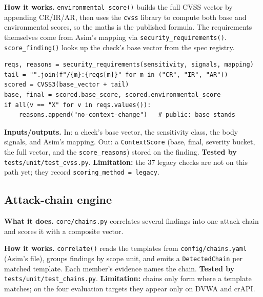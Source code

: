 \textbf{How it works.} \texttt{environmental\_score()} builds the full CVSS
vector by appending CR/IR/AR, then uses the \texttt{cvss} library to compute both
base and environmental scores, so the maths is the published formula. The
requirements themselves come from Asim's mapping via
\texttt{security\_requirements()}. \texttt{score\_finding()} looks up the check's
base vector from the spec registry.

\begin{lstlisting}[style=py,caption={Append CR/IR/AR, recompute with the \texttt{cvss} library (\texttt{core/cvss.py}).}]
reqs, reasons = security_requirements(sensitivity, signals, mapping)
tail = "".join(f"/{m}:{reqs[m]}" for m in ("CR", "IR", "AR"))
scored = CVSS3(base_vector + tail)
base, final = scored.base_score, scored.environmental_score
if all(v == "X" for v in reqs.values()):
    reasons.append("no-context-change")   # public: base stands
\end{lstlisting}


\textbf{Inputs/outputs.} In: a check's base vector, the sensitivity class, the
body signals, and Asim's mapping. Out: a \texttt{ContextScore} (base, final,
severity bucket, the full vector, and the \texttt{score\_reasons}) stored on the
finding. \textbf{Tested by} \texttt{tests/unit/test\_cvss.py}.
\textbf{Limitation:} the 37 legacy checks are not on this path yet; they record
\texttt{scoring\_method = legacy}.

\subsection{Attack-chain engine}
\textbf{What it does.} \texttt{core/chains.py} correlates several findings into
one attack chain and scores it with a composite vector.

\textbf{How it works.} \texttt{correlate()} reads the templates from
\texttt{config/chains.yaml} (Asim's file), groups findings by scope unit, and
emits a \texttt{DetectedChain} per matched template. Each member's evidence names
the chain. \textbf{Tested by} \texttt{tests/unit/test\_chains.py}.
\textbf{Limitation:} chains only form where a template matches; on the four
evaluation targets they appear only on DVWA and crAPI.

